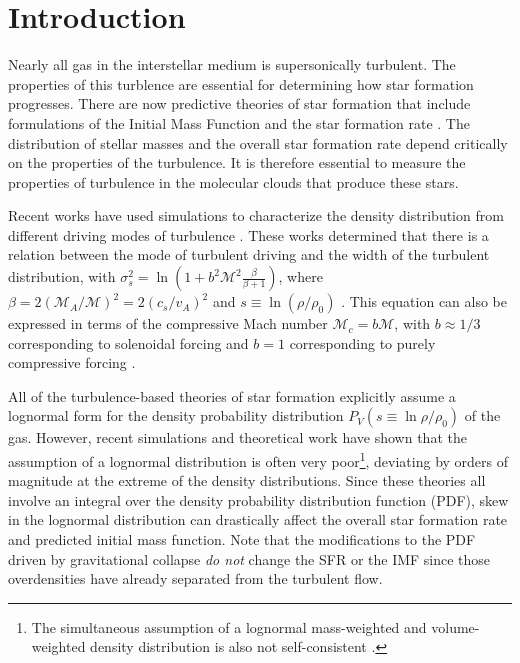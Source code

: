 

\ifstandalone

\fi

\section{Introduction}
Nearly all gas in the interstellar medium is supersonically turbulent.  The
properties of this turblence are essential for determining how star formation
progresses.
There are now predictive theories of star formation that include formulations
of the Initial Mass Function \citep[IMF;][]{Padoan2002a, Padoan2007a, Chabrier2010a, 
Elmegreen2011a, Hopkins2012b, Hennebelle2013a} and the star
formation rate
\citep[SFR;][]{Krumholz2005c,  Hennebelle2011a,
Padoan2011b, Krumholz2012b, Federrath2012a, Padoan2012a}.
The distribution of stellar masses and the overall star formation rate depend
critically on the properties of the turbulence.  It is therefore essential to
measure the properties of turbulence in the molecular clouds that produce these
stars.

Recent works have used simulations to characterize the density distribution
from different driving modes of turbulence
\citep{Federrath2008a,Federrath2009a,Federrath2010a,Federrath2011a,Price2011b,Federrath2013a}.
These works determined that there is a relation between the mode of turbulent driving and the width
of the turbulent distribution, with $\sigma_{s}^2 = \ln\left(1+b^2
\mathcal{M}^2 \frac{\beta}{\beta+1}\right)$, where $\beta=2 (\mathcal{M}_A /
\mathcal{M})^2 = 2 (c_s/v_A)^2$ and $s\equiv\ln(\rho/\rho_0)$
\citep{Padoan2011b,Molina2012a}.
This equation can also be expressed in terms of the compressive Mach number
$\mathcal{M}_c = b \mathcal{M}$, with $b\approx 1/3$ corresponding to
solenoidal forcing and $b = 1$ corresponding to purely compressive forcing
\citep{Federrath2010a,Konstandin2012a}.

All of the turbulence-based theories of star formation explicitly assume a
lognormal form for the density probability distribution $P_V(s \equiv \ln
\rho/\rho_0)$ of the gas.  However, recent simulations \citep{Federrath2013a}
and theoretical work \citep{Hopkins2013a} have shown that the assumption of a
lognormal distribution is often very poor\footnote{The simultaneous assumption
of a lognormal mass-weighted and volume-weighted density distribution is also
not self-consistent \citep{Hopkins2013a}. }, deviating by orders of magnitude
at the extreme of the density distributions.  Since these theories all involve
an integral over the density probability distribution function (PDF), skew in
the lognormal distribution can drastically affect the overall star formation
rate and predicted initial mass function.  Note that the modifications to the
PDF driven by gravitational collapse \emph{do not} change the SFR or the IMF
since those overdensities have already separated from the turbulent flow.

